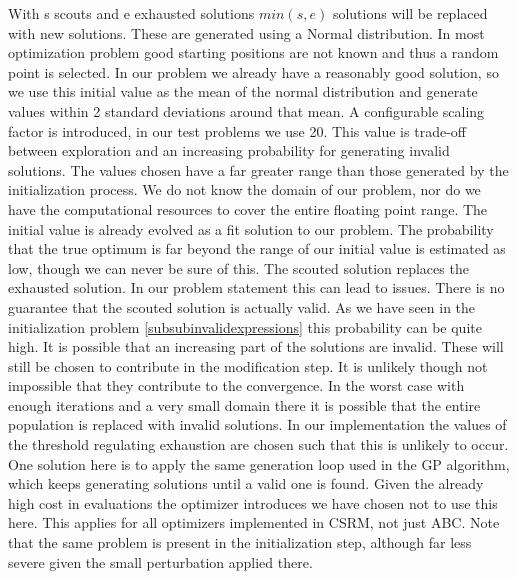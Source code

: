 With s scouts and e exhausted solutions $min(s, e)$ solutions will be replaced with new solutions. These are generated using a Normal distribution. In most optimization problem good starting positions are not known and thus a random point is selected. In our problem we already have a reasonably good solution, so we use this initial value as the mean of the normal distribution and generate values within 2 standard deviations around that mean. A configurable scaling factor is introduced, in our test problems we use 20. This value is trade-off between exploration and an increasing probability for generating invalid solutions. The values chosen have a far greater range than those generated by the initialization process. We do not know the domain of our problem, nor do we have the computational resources to cover the entire floating point range. The initial value is already evolved as a fit solution to our problem. The probability that the true optimum is far beyond the range of our initial value is estimated as low, though we can never be sure of this. The scouted solution replaces the exhausted solution. In our problem statement this can lead to issues. There is no guarantee that the scouted solution is actually valid. As we have seen in the initialization problem \ref{subsubinvalidexpressions} this probability can be quite high. It is possible that an increasing part of the solutions are invalid. These will still be chosen to contribute in the modification step. It is unlikely though not impossible that they contribute to the convergence. In the worst case with enough iterations and a very small domain there it is possible that the entire population is replaced with invalid solutions. In our implementation the values of the threshold regulating exhaustion are chosen such that this is unlikely to occur. One solution here is to apply the same generation loop used in the GP algorithm, which keeps generating solutions until a valid one is found. Given the already high cost in evaluations the optimizer introduces we have chosen not to use this here. This applies for all optimizers implemented in CSRM, not just ABC. Note that the same problem is present in the initialization step, although far less severe given the small perturbation applied there.

